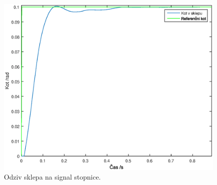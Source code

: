 \begin{figure}
	\centering
	\includegraphics[scale=0.5]{./Slike/follow_step.eps}
	\caption{Odziv sklepa na signal stopnice.}
	\label{fig:follow_step}
\end{figure}
